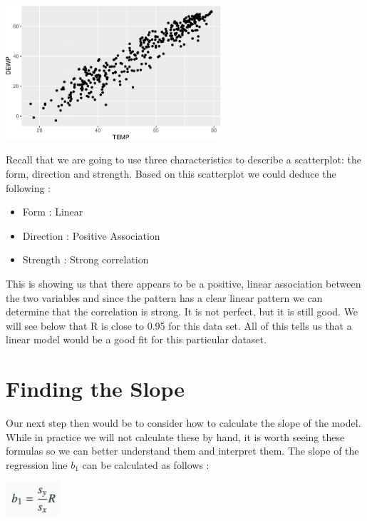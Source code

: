 \documentclass[
  letterpaper,
  DIV=11,
  numbers=noendperiod]{scrreprt}
\providecommand{\tightlist}{%
  \setlength{\itemsep}{0pt}\setlength{\parskip}{0pt}}\usepackage{longtable,booktabs,array}
\begin{document}
\begin{center}
\includegraphics[width=0.6\textwidth,height=\textheight]{Linear_Modeling_and_Regression_files/figure-pdf/unnamed-chunk-4-1.pdf}
\end{center}

Recall that we are going to use three characteristics to describe a
scatterplot: the form, direction and strength. Based on this scatterplot
we could deduce the following :

\begin{itemize}
\tightlist
\item
  Form : Linear
\item
  Direction : Positive Association
\item
  Strength : Strong correlation
\end{itemize}

This is showing us that there appears to be a positive, linear
association between the two variables and since the pattern has a clear
linear pattern we can determine that the correlation is strong. It is
not perfect, but it is still good. We will see below that R is close to
0.95 for this data set. All of this tells us that a linear model would
be a good fit for this particular dataset.

\section*{Finding the Slope}\label{finding-the-slope}


Our next step then would be to consider how to calculate the slope of
the model. While in practice we will not calculate these by hand, it is
worth seeing these formulas so we can better understand them and
interpret them. The slope of the regression line \(b_1\) can be
calculated as follows :

\includegraphics[width=0.15\textwidth,height=\textheight]{./images/LMR_4.jpg}
\end{document}
